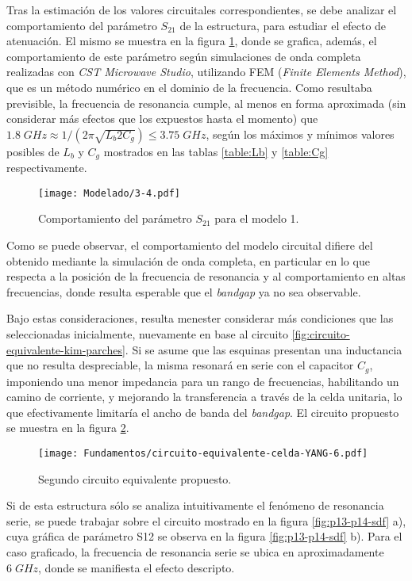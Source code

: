 Tras la estimación de los valores circuitales correspondientes, se debe analizar el comportamiento del parámetro $S_{21}$ de la estructura, para estudiar el efecto de atenuación. El mismo se muestra en la figura \ref{fig:s21-modelo1}, donde se grafica, además, el comportamiento de este parámetro según simulaciones de onda completa realizadas con \textit{CST Microwave Studio}, utilizando FEM (\textit{Finite Elements Method}), que es un método numérico en el dominio de la frecuencia. Como resultaba previsible, la frecuencia de resonancia cumple, al menos en forma aproximada (sin considerar más efectos que los expuestos hasta el momento) que $1.8\;GHz \approx 1/(2\pi\sqrt{L_{b} 2C_{g}}) \leq 3.75 \;GHz $, según los máximos y mínimos valores posibles de $L_b$ y $C_g$ mostrados en las tablas \ref{table:Lb} y \ref{table:Cg} respectivamente.

\begin{figure}[h]
	\centering
	\texttt{[image: Modelado/3-4.pdf]}
	\caption{Comportamiento del parámetro $S_{21}$ para el modelo 1.}
	\label{fig:s21-modelo1}
\end{figure}

Como se puede observar, el comportamiento del modelo circuital difiere del obtenido mediante la simulación de onda completa, en particular en lo que respecta a la posición de la frecuencia de resonancia y al comportamiento en altas frecuencias, donde resulta esperable que el \textit{bandgap} ya no sea observable.

Bajo estas consideraciones, resulta menester considerar más condiciones que las seleccionadas inicialmente, nuevamente en base al circuito \ref{fig:circuito-equivalente-kim-parches}. Si se asume que las esquinas presentan una inductancia que no resulta despreciable, la misma resonará en serie con el capacitor $C_g$, imponiendo una menor impedancia para un rango de frecuencias, habilitando un camino de corriente, y mejorando la transferencia a través de la celda unitaria, lo que efectivamente limitaría el ancho de banda del \textit{bandgap}. El circuito propuesto se muestra en la figura \ref{fig:modelo-circuital-con-lw}. 

\begin{figure}[h]
	\centering
	\texttt{[image: Fundamentos/circuito-equivalente-celda-YANG-6.pdf]}
	\caption{Segundo circuito equivalente propuesto.}
	\label{fig:modelo-circuital-con-lw}
\end{figure}

Si de esta estructura sólo se analiza intuitivamente el fenómeno de resonancia serie, se puede trabajar sobre el circuito mostrado en la figura \ref{fig:p13-p14-sdf} a), cuya gráfica de parámetro S12 se observa en la figura \ref{fig:p13-p14-sdf} b). Para el caso graficado, la frecuencia de resonancia serie se ubica en aproximadamente $6\; GHz$, donde se manifiesta el efecto descripto.


